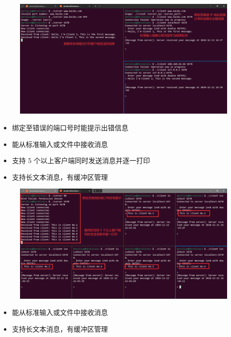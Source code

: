 \documentclass[14pt,a4paper,UTF8,twoside]{article}
\begin{document}
\begin{figure}[H]
    \centering
    \includegraphics[width=0.9\linewidth]{lab7/result.png}
\end{figure}

\begin{ctt}
    \begin{itemize}
    \item 绑定至错误的端口号时能提示出错信息
    \item 能从标准输入或文件中接收消息
    \item 支持 5 个以上客户端同时发送消息并逐一打印
    \item 支持长文本消息，有缓冲区管理
    \end{itemize}
\end{ctt}

\begin{figure}[H]
    \centering
    \includegraphics[width=0.9\linewidth]{lab7/result1.png}
\end{figure}

\begin{ctt}
    \begin{itemize}
        \item 能从标准输入或文件中接收消息
        \item 支持长文本消息，有缓冲区管理
    \end{itemize}
\end{ctt}
\end{document}
